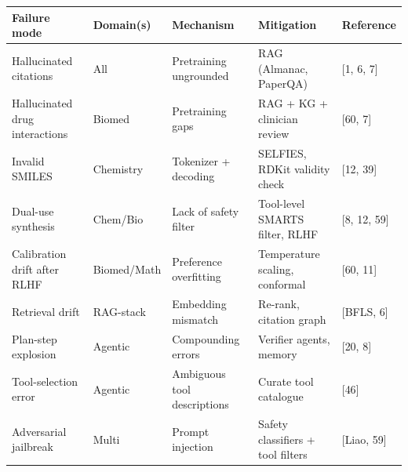{\def\LTcaptype{none} %
\begin{longtable}[]{@{}
  >{\raggedright\arraybackslash}p{}
  >{\raggedright\arraybackslash}p{}
  >{\raggedright\arraybackslash}p{}
  >{\raggedright\arraybackslash}p{}
  >{\raggedright\arraybackslash}p{}@{}}
\toprule\noalign{}
\begin{minipage}[b]{\linewidth}\raggedright
Failure mode
\end{minipage} & \begin{minipage}[b]{\linewidth}\raggedright
Domain(s)
\end{minipage} & \begin{minipage}[b]{\linewidth}\raggedright
Mechanism
\end{minipage} & \begin{minipage}[b]{\linewidth}\raggedright
Mitigation
\end{minipage} & \begin{minipage}[b]{\linewidth}\raggedright
Reference
\end{minipage} \\
\midrule\noalign{}
\endhead
\bottomrule\noalign{}
\endlastfoot
Hallucinated citations & All & Pretraining ungrounded & RAG (Almanac, PaperQA) & {[}1, 6, 7{]} \\
Hallucinated drug interactions & Biomed & Pretraining gaps & RAG + KG + clinician review & {[}60, 7{]} \\
Invalid SMILES & Chemistry & Tokenizer + decoding & SELFIES, RDKit validity check & {[}12, 39{]} \\
Dual-use synthesis & Chem/Bio & Lack of safety filter & Tool-level SMARTS filter, RLHF & {[}8, 12, 59{]} \\
Calibration drift after RLHF & Biomed/Math & Preference overfitting & Temperature scaling, conformal & {[}60, 11{]} \\
Retrieval drift & RAG-stack & Embedding mismatch & Re-rank, citation graph & {[}BFLS, 6{]} \\
Plan-step explosion & Agentic & Compounding errors & Verifier agents, memory & {[}20, 8{]} \\
Tool-selection error & Agentic & Ambiguous tool descriptions & Curate tool catalogue & {[}46{]} \\
Adversarial jailbreak & Multi & Prompt injection & Safety classifiers + tool filters & {[}Liao, 59{]} \\

\end{longtable}}
